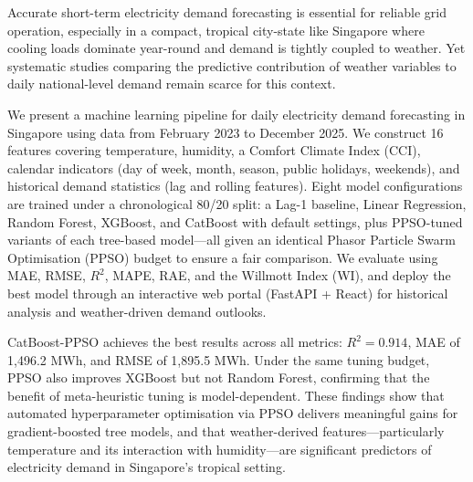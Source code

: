 
Accurate short-term electricity demand forecasting is essential for reliable grid operation, especially in a compact, tropical city-state like Singapore where cooling loads dominate year-round and demand is tightly coupled to weather. Yet systematic studies comparing the predictive contribution of weather variables to daily national-level demand remain scarce for this context.

We present a machine learning pipeline for daily electricity demand forecasting in Singapore using data from February 2023 to December 2025. We construct 16 features covering temperature, humidity, a Comfort Climate Index (CCI), calendar indicators (day of week, month, season, public holidays, weekends), and historical demand statistics (lag and rolling features). Eight model configurations are trained under a chronological 80/20 split: a Lag-1 baseline, Linear Regression, Random Forest, XGBoost, and CatBoost with default settings, plus PPSO-tuned variants of each tree-based model---all given an identical Phasor Particle Swarm Optimisation (PPSO) budget to ensure a fair comparison. We evaluate using MAE, RMSE, $R^2$, MAPE, RAE, and the Willmott Index (WI), and deploy the best model through an interactive web portal (FastAPI + React) for historical analysis and weather-driven demand outlooks.

CatBoost-PPSO achieves the best results across all metrics: $R^2 = 0.914$, MAE of 1{,}496.2 MWh, and RMSE of 1{,}895.5 MWh. Under the same tuning budget, PPSO also improves XGBoost but not Random Forest, confirming that the benefit of meta-heuristic tuning is model-dependent. These findings show that automated hyperparameter optimisation via PPSO delivers meaningful gains for gradient-boosted tree models, and that weather-derived features---particularly temperature and its interaction with humidity---are significant predictors of electricity demand in Singapore's tropical setting.

\afterpreface
